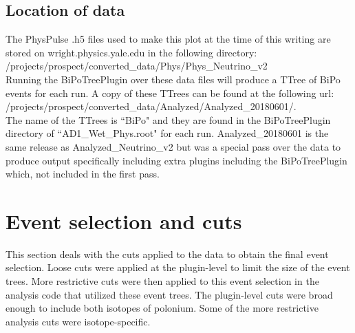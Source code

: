 \subsection{Location of data}
The PhysPulse .h5 files used to make this plot at the time of this writing are stored on wright.physics.yale.edu in the following directory:\\ /projects/prospect/converted\_data/Phys/Phys\_Neutrino\_v2\\ Running the BiPoTreePlugin over these data files will produce a TTree of BiPo events for each run. A copy of these TTrees can be found at the following url:\\ /projects/prospect/converted\_data/Analyzed/Analyzed\_20180601/. \\The name of the TTrees is ``BiPo" and they are found in the BiPoTreePlugin directory of ``AD1\_Wet\_Phys.root" for each run. Analyzed\_20180601 is the same release as Analyzed\_Neutrino\_v2 but was a special pass over the data to produce output specifically including extra plugins including the BiPoTreePlugin which, not included in the first pass.

\section{Event selection and cuts\label{sec:cuts}}
This section deals with the cuts applied to the data to obtain the final event selection. Loose cuts were applied at the plugin-level to limit the size of the event trees. More restrictive cuts were then applied to this event selection in the analysis code that utilized these event trees. The plugin-level cuts were broad enough to include both isotopes of polonium. Some of the more restrictive analysis cuts were isotope-specific.
